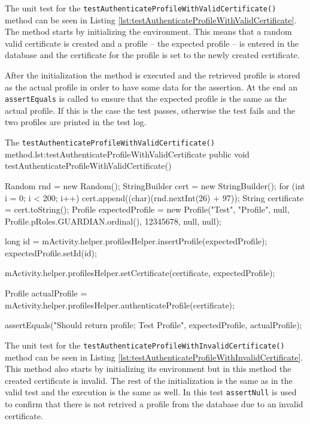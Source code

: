 The unit test for the \texttt{testAuthenticateProfileWithValidCertificate()} method can be seen in Listing \vref{lst:testAuthenticateProfileWithValidCertificate}.
The method starts by initializing the environment.
This means that a random valid certificate is created and a profile -- the expected profile -- is entered in the database and the certificate for the profile is set to the newly created certificate.

After the initialization the method is executed and the retrieved profile is stored as the actual profile in order to have some data for the assertion.
At the end an \texttt{assertEquals} is called to ensure that the expected profile is the same as the actual profile.
If this is the case the test passes, otherwise the test fails and the two profiles are printed in the test log. 


\begin{Java}{The \texttt{testAuthenticateProfileWithValidCertificate()} method.}{lst:testAuthenticateProfileWithValidCertificate}
public void testAuthenticateProfileWithValidCertificate() {
	Random rnd = new Random();
	StringBuilder cert = new StringBuilder();
	for (int i = 0; i < 200; i++)
	{
		cert.append((char)(rnd.nextInt(26) + 97));
	}
	String certificate = cert.toString();
	Profile expectedProfile = new Profile("Test", "Profile", null, Profile.pRoles.GUARDIAN.ordinal(), 12345678, null, null);

	long id = mActivity.helper.profilesHelper.insertProfile(expectedProfile);
	expectedProfile.setId(id);
	
	mActivity.helper.profilesHelper.setCertificate(certificate, expectedProfile);

	Profile actualProfile = mActivity.helper.profilesHelper.authenticateProfile(certificate);

	assertEquals("Should return profile; Test Profile", expectedProfile, actualProfile);
}
\end{Java}

The unit test for the \texttt{testAuthenticateProfileWithInvalidCertificate()} method can be seen in Listing \vref{lst:testAuthenticateProfileWithInvalidCertificate}.
This method also starts by initializing its environment but in this method the created certificate is invalid.
The rest of the initialization is the same as in the valid test and the execution is the same as well.
In this test \texttt{assertNull} is used to confirm that there is not retrived a profile from the database due to an invalid certificate.

